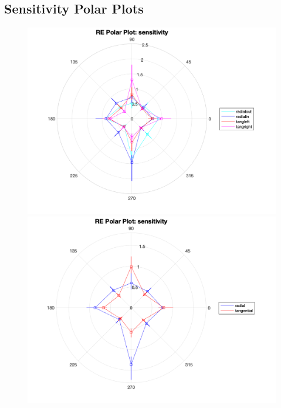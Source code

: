 \documentclass[11pt]{article} %
\begin{document}
\subsection{Sensitivity Polar Plots}
\begin{figure}[H]
\centering %
\includegraphics[scale=.3]{Images/RE_PP_sensitivity_Alldata_4conds.png}
\includegraphics[scale=.3]{Images/RE_PP_sensitivity_Alldata_2conds.png}
\end{figure}
\end{document}
